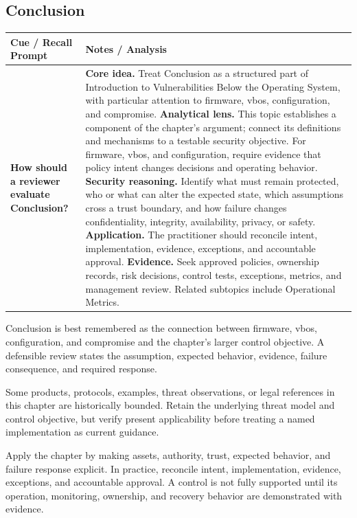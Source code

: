 \documentclass[11pt]{article}
\newcommand{\CornellHeader}{%
\rowcolor{Navy}\color{white}\bfseries Cue / Recall Prompt & \color{white}\bfseries Notes / Analysis\\\hline}
\newcommand{\CornellRow}[2]{%
\cellcolor{CueGray}\RaggedRight\textbf{#1} & \RaggedRight #2\\\hline}
\begin{document}
\subsection*{Conclusion}
\begin{longtable}{>{\RaggedRight\arraybackslash}p{}|>{\RaggedRight\arraybackslash}p{}}
\CornellHeader
\CornellRow{How should a reviewer evaluate Conclusion?}{\textbf{Core idea.} Treat Conclusion as a structured part of Introduction to Vulnerabilities Below the Operating System, with particular attention to firmware, vbos, configuration, and compromise. \textbf{Analytical lens.} This topic establishes a component of the chapter's argument; connect its definitions and mechanisms to a testable security objective. For firmware, vbos, and configuration, require evidence that policy intent changes decisions and operating behavior. \textbf{Security reasoning.} Identify what must remain protected, who or what can alter the expected state, which assumptions cross a trust boundary, and how failure changes confidentiality, integrity, availability, privacy, or safety. \textbf{Application.} The practitioner should reconcile intent, implementation, evidence, exceptions, and accountable approval. \textbf{Evidence.} Seek approved policies, ownership records, risk decisions, control tests, exceptions, metrics, and management review. Related subtopics include Operational Metrics.}
\end{longtable}
\begin{topicsummary}
Conclusion is best remembered as the connection between firmware, vbos, configuration, and compromise and the chapter's larger control objective. A defensible review states the assumption, expected behavior, evidence, failure consequence, and required response.
\end{topicsummary}
\begin{historybox}
Some products, protocols, examples, threat observations, or legal references in this chapter are historically bounded. Retain the underlying threat model and control objective, but verify present applicability before treating a named implementation as current guidance.
\end{historybox}
\begin{defensebox}
Apply the chapter by making assets, authority, trust, expected behavior, and failure response explicit. In practice, reconcile intent, implementation, evidence, exceptions, and accountable approval. A control is not fully supported until its operation, monitoring, ownership, and recovery behavior are demonstrated with evidence.
\end{defensebox}
\end{document}
